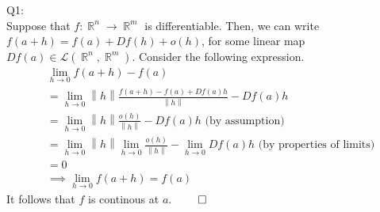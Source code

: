 \documentclass[letterpaper]{article}
\DeclareMathOperator{\R}{\mathbb{R}}
\newcommand{\norm}[1]{\left\lVert#1\right\rVert}
\begin{document}
Q1:\\
Suppose that $f : \R^n \rightarrow \R^m$ is differentiable. Then, we can write $f(a+h) = f(a) + Df(h) + o(h)$, for some linear map $Df(a) \in \mathcal{L}(\R^n,\R^m)$. 
Consider the following expression. 
\begin{align*}
     & \lim_{h \rightarrow 0} f(a+h) -f(a)
     \\ & = \lim_{h \rightarrow 0} \norm{h} \frac{f(a+h)-f(a) +Df(a)h}{\norm{h}} -Df(a)h
     \\ & = \lim_{h \rightarrow 0} \norm{h} \frac{o(h)}{\norm{h}} -Df(a)h \text{ (by assumption)}
     \\ & = \lim_{h\rightarrow 0} \norm{h} \lim_{h \rightarrow 0} \frac{o(h)}{\norm{h}} - \lim_{h\rightarrow 0} Df(a)h \text{ (by properties of limits)}
     \\ & = 0
     \\ & \implies \lim_{h \rightarrow 0} f(a+h) = f(a)
\end{align*}
It follows that $f$ is continous at $a$. $\qed$
\end{document}
